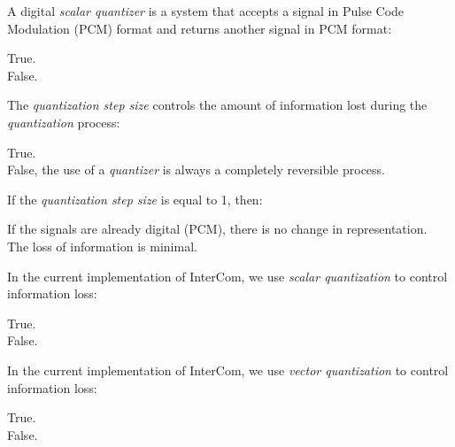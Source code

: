 \documentclass[legalpaper, 12pt, addpoints]{exam}
\begin{document}
\begin{questions}
\vspace{0.10in}

\question A digital \emph{scalar quantizer} is a system that accepts a signal in Pulse Code Modulation (PCM) format and returns another signal in PCM format:

\begin{oneparchoices}
  \choice True.\\
  \choice False.
\end{oneparchoices}
  
\vspace{0.10in}

\question The \emph{quantization step size} controls the amount of information lost during the \emph{quantization} process:

\begin{oneparchoices}
  \choice True.\\
  \choice False, the use of a \emph{quantizer} is always a completely reversible process.
\end{oneparchoices}
  
\vspace{0.10in}

\question If the \emph{quantization step size} is equal to 1, then:

\begin{oneparchoices}
  \choice If the signals are already digital (PCM), there is no change in representation.\\
  \choice The loss of information is minimal.
\end{oneparchoices}
  
\vspace{0.10in}

\question In the current implementation of InterCom, we use \emph{scalar quantization} to control information loss:

\begin{oneparchoices}
  \choice True.\\
  \choice False.
\end{oneparchoices}
  
\vspace{0.10in}

\question In the current implementation of InterCom, we use \emph{vector quantization} to control information loss:

\begin{oneparchoices}
  \choice True.\\
  \choice False.
\end{oneparchoices}
  

\end{questions}
\end{document}
